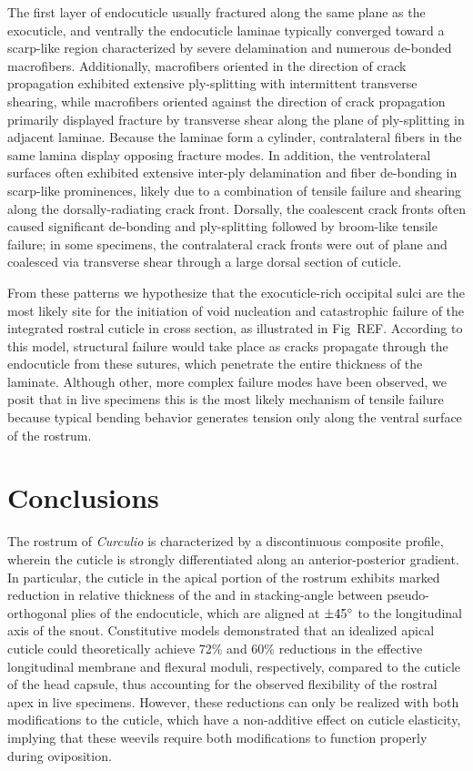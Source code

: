 \documentclass[twocolumn, linenumbers, superscriptaddress, nofootinbib]{revtex4-1}
\begin{document}
		The first layer of endocuticle usually fractured along the same plane as the exocuticle, and ventrally the endocuticle laminae typically converged toward a scarp-like region characterized by severe delamination and numerous de-bonded macrofibers.
		Additionally, macrofibers oriented in the direction of crack propagation exhibited extensive ply-splitting with intermittent transverse shearing, while macrofibers oriented against the direction of crack propagation primarily displayed fracture by transverse shear along the plane of ply-splitting in adjacent laminae.
		Because the laminae form a cylinder, contralateral fibers in the same lamina display opposing fracture modes.
		In addition, the ventrolateral surfaces often exhibited extensive inter-ply delamination and fiber de-bonding in scarp-like prominences, likely due to a combination of tensile failure and shearing along the dorsally-radiating crack front.
		Dorsally, the coalescent crack fronts often caused significant de-bonding and ply-splitting followed by broom-like tensile failure; in some specimens, the contralateral crack fronts were out of plane and coalesced via transverse shear through a large dorsal section of cuticle.
		
		From these patterns we hypothesize that the exocuticle-rich occipital sulci are the most likely site for the initiation of void nucleation and catastrophic failure of the integrated rostral cuticle in cross section, as illustrated in Fig~REF.
		According to this model, structural failure would take place as cracks propagate through the endocuticle from these sutures, which penetrate the entire thickness of the laminate.
		Although other, more complex failure modes have been observed, we posit that in live specimens this is the most likely mechanism of tensile failure because typical bending behavior generates tension only along the ventral surface of the rostrum.

	\section{Conclusions}

		The rostrum of \textit{Curculio} is characterized by a discontinuous composite profile, wherein the cuticle is strongly differentiated along an anterior-posterior gradient.
		In particular, the cuticle in the apical portion of the rostrum exhibits marked reduction in relative thickness of the and in stacking-angle between pseudo-orthogonal plies of the endocuticle, which are aligned at $\pm45\degree$ to the longitudinal axis of the snout.
		Constitutive models demonstrated that an idealized apical cuticle could theoretically achieve 72\% and 60\% reductions in the effective longitudinal membrane and flexural moduli, respectively, compared to the cuticle of the head capsule, thus accounting for the observed flexibility of the rostral apex in live specimens.
		However, these reductions can only be realized with both modifications to the cuticle, which have a non-additive effect on cuticle elasticity, implying that these weevils require both modifications to function properly during oviposition.
		
\end{document}
